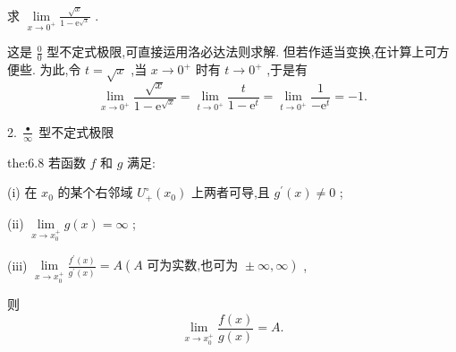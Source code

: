 \begin{example}
求 \(\mathop{\lim }\limits_{{x \rightarrow  {0}^{ + }}}\frac{\sqrt{x}}{1 - {\mathrm{e}}^{\sqrt{x}}}\) .
\end{example}


\begin{solution}
这是 \(\frac{0}{0}\) 型不定式极限,可直接运用洛必达法则求解. 但若作适当变换,在计算上可方便些. 为此,令 \(t = \sqrt{x}\) ,当 \(x \rightarrow  {0}^{ + }\) 时有 \(t \rightarrow  {0}^{ + }\) ,于是有
\[
\mathop{\lim }\limits_{{x \rightarrow  {0}^{ + }}}\frac{\sqrt{x}}{1 - {\mathrm{e}}^{\sqrt{x}}} = \mathop{\lim }\limits_{{t \rightarrow  {0}^{ + }}}\frac{t}{1 - {\mathrm{e}}^{t}} = \mathop{\lim }\limits_{{t \rightarrow  {0}^{ + }}}\frac{1}{-{\mathrm{e}}^{t}} =  - 1.
\]
\end{solution}

2. \(\frac{ \bullet  }{\infty }\) 型不定式极限

\begin{theorem}{}{the:6.8}
若函数 \(f\) 和 \(g\) 满足:

(i) 在 \({x}_{0}\) 的某个右邻域 \({U}_{ + }^{ \circ  }\left( {x}_{0}\right)\) 上两者可导,且 \({g}^{\prime }\left( x\right)  \neq  0\) ;

(ii) \(\mathop{\lim }\limits_{{x \rightarrow  {x}_{0}^{ + }}}g\left( x\right)  = \infty\) ;

(iii) \(\mathop{\lim }\limits_{{x \rightarrow  {x}_{0}^{ + }}}\frac{{f}^{\prime }\left( x\right) }{{g}^{\prime }\left( x\right) } = A\left( {A\text{ 可为实数,也可为 } \pm  \infty ,\infty }\right)\) ,

则
\[
\mathop{\lim }\limits_{{x \rightarrow  {x}_{0}^{ + }}}\frac{f\left( x\right) }{g\left( x\right) } = A.
\]
\end{theorem}

